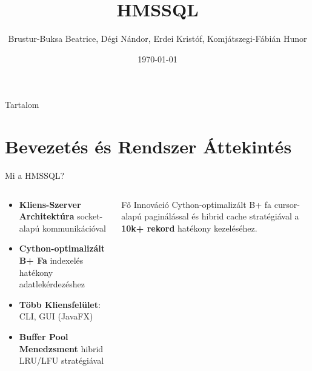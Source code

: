 \documentclass[aspectratio=169]{beamer}
\title{\Huge{HMSSQL}}
\author{Brustur-Buksa Beatrice, Dégi Nándor, Erdei Kristóf, Komjátszegi-Fábián Hunor}
\date{\today}
\begin{document}
\frame{\titlepage}

\begin{frame}{Tartalom}
\tableofcontents[hideallsubsections]
\end{frame}

\section{Bevezetés és Rendszer Áttekintés}

\begin{frame}{Mi a HMSSQL?}
\begin{columns}
\begin{column}{0.6\textwidth}
\begin{itemize}
    \item \textbf{Kliens-Szerver Architektúra} socket-alapú kommunikációval
    \item \textbf{Cython-optimalizált B+ Fa} indexelés hatékony adatlekérdezéshez
    \item \textbf{Több Kliensfelület}: CLI, GUI (JavaFX)
    \item \textbf{Buffer Pool Menedzsment} hibrid LRU/LFU stratégiával
\end{itemize}
\end{column}
\begin{column}{0.35\textwidth}
\begin{alertblock}{Fő Innováció}
Cython-optimalizált B+ fa cursor-alapú paginálással és hibrid cache stratégiával a \textbf{10k+ rekord} hatékony kezeléséhez.
\end{alertblock}
\end{column}
\end{columns}
\end{frame}
\end{document}
